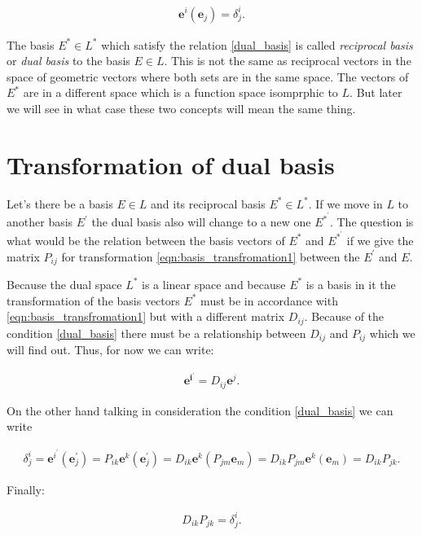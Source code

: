 \documentclass{book}
\begin{document}
\begin{align}
\boldsymbol{e}^{i}(\boldsymbol{e}_j) = \delta^{i}_j. \label{dual_basis}
\end{align}

The basis $E^{*} \in L^{*}$ which satisfy the relation \eqref{dual_basis} is called \emph{reciprocal basis} or \emph{dual basis} to the basis $E \in L$. This is not the same as reciprocal vectors in the space of geometric vectors where both sets are in the same space. The vectors of $E^{*}$ are in a different space which is a function space isomprphic to $L$. But later we will see in what case these two concepts will mean the same thing.

\section{Transformation of dual basis}

Let's there be a basis $E \in L$ and its reciprocal basis $E^{*} \in L^*$. If we move in $L$ to another basis $E^{'}$ the dual basis also will change to a new one $E^{*}^{'}$. The question is what would be the relation between the basis vectors of $E^{*}$ and $E^{*}^{'}$ if we give the matrix $P_{ij}$ for transformation \eqref{eqn:basis_transfromation1} between the $E^{'}$ and $E$.

Because the dual space $L^*$ is a linear space and because $E^{*}$ is a basis in it the transformation of the basis vectors $E^{*}$ must be in accordance with \eqref{eqn:basis_transfromation1} but with a different matrix $D_{ij}$. Because of the condition \eqref{dual_basis} there must be a relationship between $D_{ij}$ and $P_{ij}$ which we will find out. Thus, for now we can write:

\begin{align*}
\boldsymbol{e^{i}^{'}} = D_{ij}\boldsymbol{e}^{j}.
\end{align*}

On the other hand talking in consideration the condition \eqref{dual_basis} we can write

\begin{align}
\delta^{i}_j = \boldsymbol{e}^{i}^{'}(\boldsymbol{e}^{'}_j) = P_{ik}\boldsymbol{e}^{k}(\boldsymbol{e}^{'}_j)
= D_{ik}\boldsymbol{e}^{k}(P_{jm}\boldsymbol{e}_m)
= D_{ik}P_{jm}\boldsymbol{e}^{k}(\boldsymbol{e}_m) = D_{ik}P_{jk}.
\end{align}

Finally:

\begin{align}
 D_{ik}P_{jk} = \delta^{i}_j.
\end{align}
\end{document}
